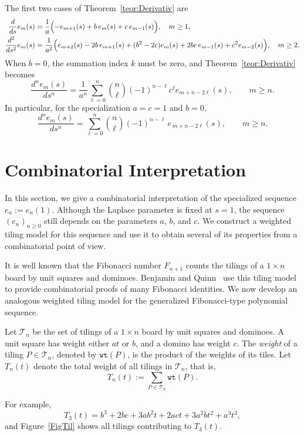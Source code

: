\documentclass[11pt]{amsart}
\newcommand{\wt}{{\texttt{wt}}}
\theoremstyle{plain}
\numberwithin{equation}{section}
\begin{document}
The first two cases of Theorem~\ref{teor:Derivativ} are
\begin{align*}
\frac{d}{ds}e_m(s)
&=
\frac{1}{a}
\Bigl(
-e_{m+1}(s)+b\,e_m(s)+c\,e_{m-1}(s)
\Bigr),
\quad m\geq 1,
\\
\frac{d^2}{ds^2}e_m(s)
&=
\frac{1}{a^2}
\Bigl(
e_{m+2}(s)-2b\,e_{m+1}(s)
+(b^2-2c)e_m(s)
+2bc\,e_{m-1}(s)
+c^2e_{m-2}(s)
\Bigr),
\quad m\geq 2.
\end{align*}
When $b=0$, the summation index $k$ must be zero, and
Theorem~\ref{teor:Derivativ} becomes
\[
\frac{d^n e_m(s)}{ds^n}
=
\frac{1}{a^n}
\sum_{\ell=0}^{n}
\binom{n}{\ell}
(-1)^{n-\ell}c^\ell
e_{m+n-2\ell}(s),
\qquad m\geq n.
\]
In particular, for the specialization $a=c=1$ and $b=0$,
\[
\frac{d^{n}e_{m}(s)}{ds^{n}}
=\sum_{\ell=0}^{n}\binom{n}{\ell}(-1)^{n-\ell}\,e_{\,m+n-2\ell}(s), \qquad m\geq n.
\]


\section{Combinatorial Interpretation}

In this section, we give a combinatorial interpretation of the specialized sequence $e_n:=e_n(1)$. Although the Laplace parameter is fixed at $s=1$, the sequence $(e_n)_{n\geq 0}$ still depends on the parameters $a$, $b$, and $c$. We construct a weighted tiling model for this sequence and use it to obtain several of its properties from a combinatorial point of view.

It is well known that the Fibonacci number $F_{n+1}$ counts the tilings of a $1\times n$ board by unit squares and dominoes. Benjamin and Quinn~\cite{bookBenjamin} use this tiling model to provide combinatorial proofs of many Fibonacci identities. We now develop an analogous weighted tiling model for the generalized Fibonacci-type polynomial sequence.

Let $\mathcal{T}_n$ be the set of tilings of a $1\times n$ board by unit squares and dominoes.  A unit square has weight either $at$ or $b$, and a domino has
weight $c$. The \emph{weight} of a tiling $P\in\mathcal{T}_n$, denoted by $\wt(P)$, is the product of the weights of its tiles. Let $T_n(t)$ denote the total weight of all tilings in $\mathcal{T}_n$, that is,
\[
T_n(t):=\sum_{P\in\mathcal{T}_n}\wt(P).
\]

For example,
\[
T_3(t)=b^3+2bc+3ab^2t+2act+3a^2bt^2+a^3t^3,
\]
and Figure~\ref{FigTil} shows all tilings contributing to $T_3(t)$.
\end{document}
